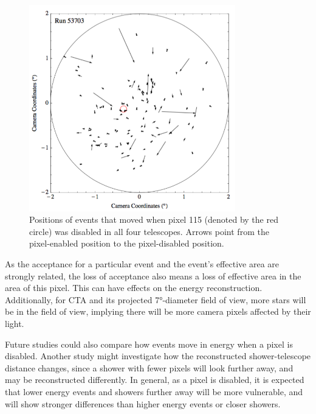     \begin{figure}[ht]
      \centering
      \includegraphics[width=0.8\textwidth]{images/disabled_pixel/moving_events}
      \caption[Event Movement]{
        Positions of events that moved when pixel 115 (denoted by the red circle) was disabled in all four telescopes.  
        Arrows point from the pixel-enabled position to the pixel-disabled position.
      }
      \label{fig:dpix_move}
    \end{figure}

    As the acceptance for a particular event and the event's effective area are strongly related, the loss of acceptance also means a loss of effective area in the area of this pixel.
    This can have effects on the energy reconstruction.
    Additionally, for CTA and its projected \ang{7}-diameter field of view, more stars will be in the field of view, implying there will be more camera pixels affected by their light.

    Future studies could also compare how events move in energy when a pixel is disabled.
    Another study might investigate how the reconstructed shower-telescope distance changes, since a shower with fewer pixels will look further away, and may be reconstructed differently.
    In general, as a pixel is disabled, it is expected that lower energy events and showers further away will be more vulnerable, and will show stronger differences than higher energy events or closer showers.


